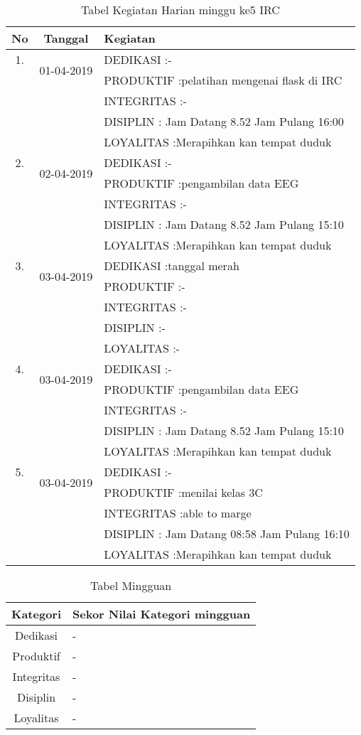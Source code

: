 \begin{table}[h]
\caption{Tabel Kegiatan Harian minggu ke5 IRC}
\centering
\begin{tabular}{|c|c|l|}
\hline
No&Tanggal&Kegiatan\\
\hline
1.&\multirow{2}{*}{01-04-2019}
&DEDIKASI :-\\
&&PRODUKTIF :pelatihan mengenai flask di IRC\\
&&INTEGRITAS :-\\
&&DISIPLIN : Jam Datang 8.52 Jam Pulang 16:00\\
&&LOYALITAS :Merapihkan kan tempat duduk\\
\hline
2.&\multirow{2}{*}{02-04-2019}
&DEDIKASI :-\\
&&PRODUKTIF :pengambilan data EEG\\
&&INTEGRITAS :-\\
&&DISIPLIN : Jam Datang 8.52 Jam Pulang 15:10\\
&&LOYALITAS :Merapihkan kan tempat duduk\\
\hline
3.&\multirow{2}{*}{03-04-2019}
&DEDIKASI :tanggal merah\\
&&PRODUKTIF :-\\
&&INTEGRITAS :-\\
&&DISIPLIN :-\\
&&LOYALITAS :-\\
\hline
4.&\multirow{2}{*}{03-04-2019}
&DEDIKASI :-\\
&&PRODUKTIF :pengambilan data EEG\\
&&INTEGRITAS :-\\
&&DISIPLIN : Jam Datang 8.52 Jam Pulang 15:10\\
&&LOYALITAS :Merapihkan kan tempat duduk\\
\hline
5.&\multirow{2}{*}{03-04-2019}
&DEDIKASI :-\\
&&PRODUKTIF :menilai kelas 3C\\
&&INTEGRITAS :able to marge\\
&&DISIPLIN : Jam Datang 08:58 Jam Pulang 16:10\\
&&LOYALITAS :Merapihkan kan tempat duduk\\
\hline
\end{tabular}
\label{table:contoh}
\end{table}


\begin{table}[h]
\begin{center}
\caption{Tabel Mingguan}
\begin{tabular}{|c|l|}
\hline
Kategori& Sekor Nilai Kategori mingguan\\
\hline
Dedikasi & -\\
\hline
Produktif & -\\
\hline
Integritas & -\\
\hline
Disiplin & -\\
\hline
Loyalitas & -\\
\hline
\end{tabular}
\end{center}
\label {Tabel:contoh} 
\end{table}

